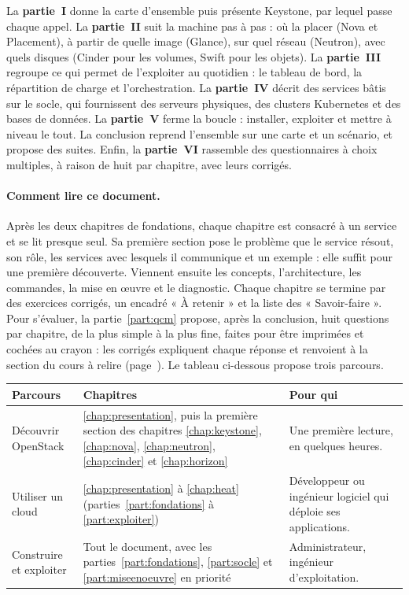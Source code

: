 La \textbf{partie~I} donne la carte d'ensemble puis présente Keystone, par lequel passe chaque appel. La \textbf{partie~II} suit la
machine pas à pas : où la placer (Nova et Placement), à partir de quelle image (Glance), sur quel réseau (Neutron), avec quels
disques (Cinder pour les volumes, Swift pour les objets). La \textbf{partie~III} regroupe ce qui permet de l'exploiter au quotidien :
le tableau de bord, la répartition de charge et l'orchestration. La \textbf{partie~IV} décrit des services bâtis sur le socle, qui
fournissent des serveurs physiques, des clusters Kubernetes et des bases de données. La \textbf{partie~V} ferme la boucle : installer,
exploiter et mettre à niveau le tout. La conclusion reprend l'ensemble sur une carte et un scénario, et propose des suites. Enfin, la \textbf{partie~VI}
rassemble des questionnaires à choix multiples, à raison de huit par chapitre, avec leurs corrigés.

\paragraph{Comment lire ce document.} Après les deux chapitres de fondations, chaque chapitre est consacré à un service et se lit
presque seul. Sa première section pose le problème que le service résout, son rôle, les services avec lesquels il communique et
un exemple : elle suffit pour une première découverte. Viennent ensuite les concepts, l'architecture, les commandes, la mise en œuvre
et le diagnostic. Chaque chapitre se termine par des exercices corrigés, un encadré « À retenir » et la liste des « Savoir-faire ».
Pour s'évaluer, la partie~\ref{part:qcm} propose, après la conclusion, huit questions par chapitre, de la plus simple à la plus fine,
faites pour être imprimées et cochées au crayon : les corrigés expliquent chaque réponse et renvoient à la section du cours à relire
(page~\pageref{part:qcm}). Le tableau ci-dessous propose trois parcours.

\begin{center}
\renewcommand{\arraystretch}{1.3}
\begin{tabular}{@{}>{\raggedright\arraybackslash}p{3.6cm}>{\raggedright\arraybackslash}p{6.4cm}>{\raggedright\arraybackslash}p{5.6cm}@{}}
\toprule
\textbf{Parcours} & \textbf{Chapitres} & \textbf{Pour qui} \\
\midrule
Découvrir OpenStack & \ref{chap:presentation}, puis la première section des chapitres \ref{chap:keystone}, \ref{chap:nova},
  \ref{chap:neutron}, \ref{chap:cinder} et \ref{chap:horizon} & Une première lecture, en quelques heures. \\
Utiliser un cloud & \ref{chap:presentation} à \ref{chap:heat} (parties~\ref{part:fondations} à \ref{part:exploiter}) & Développeur ou ingénieur
  logiciel qui déploie ses applications. \\
Construire et exploiter & Tout le document, avec les parties~\ref{part:fondations}, \ref{part:socle} et \ref{part:miseenoeuvre} en priorité &
  Administrateur, ingénieur d'exploitation. \\
\bottomrule
\end{tabular}
\end{center}

